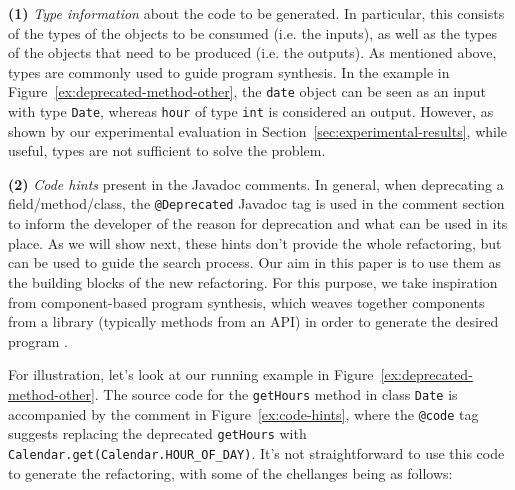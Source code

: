 \documentclass[10pt,conference]{IEEEtran}
\begin{document}
{\bf (1)} {\em Type information} about the code to be generated. In particular, this consists of the types of the objects to be consumed (i.e. the inputs), as well as the types of the objects that need to be produced (i.e. the outputs). As mentioned above, types are commonly used to guide  program synthesis. In the example in Figure~\ref{ex:deprecated-method-other}, the \texttt{date} object can be seen as an input with type \texttt{Date}, whereas \texttt{hour} of type \texttt{int} is considered an output.
However, as shown by our experimental evaluation in Section~\ref{sec:experimental-results}, while useful, types are not sufficient to solve the problem. 

{\bf (2)} {\em Code hints} present in the Javadoc comments. In general, when deprecating a field/method/class, the \texttt{@Deprecated} Javadoc tag is used in the
comment section to inform the developer of the reason for deprecation and what can be used in its place. As we will show next,
these hints don't provide the whole refactoring, but can be used to guide the search process.
Our aim in this paper is to use them as the building blocks
of the new refactoring. 
For this purpose, we take inspiration from component-based program synthesis,
which weaves together components from a library
(typically methods from an API) in order to generate the desired program \cite{DBLP:conf/icse/JhaGST10,DBLP:conf/pldi/GulwaniJTV11,DBLP:conf/popl/FengM0DR17}.


  
For illustration, let's look at our running example in Figure~\ref{ex:deprecated-method-other}. The source code for the \texttt{getHours} method in class \texttt{Date} is accompanied by the comment in Figure~\ref{ex:code-hints}, where the \texttt{@code} tag suggests replacing the deprecated \texttt{getHours}
with \texttt{Calendar.get(Calendar.HOUR\_OF\_DAY)}.
%
It's not straightforward to use this code to generate the refactoring, with some of the chellanges being as follows: 
\end{document}
